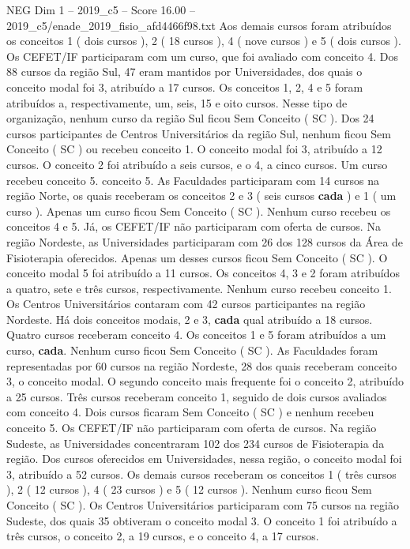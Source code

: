 \begin{textsample}{NEG Dim 1 – 2019\_c5 – Score 16.00 – 2019\_c5/enade\_2019\_fisio\_afd4466f98.txt}
Aos demais cursos foram atribuídos os conceitos 1 ( dois cursos ), 2 ( 18 cursos ), 4 ( nove cursos ) e 5 ( dois cursos ).
Os CEFET/IF participaram com um curso, que foi avaliado com conceito 4.
Dos 88 cursos da região Sul, 47 eram mantidos por Universidades, dos quais o conceito modal foi 3, atribuído a 17 cursos.
Os conceitos 1, 2, 4 e 5 foram atribuídos a, respectivamente, um, seis, 15 e oito cursos.
Nesse tipo de organização, nenhum curso da região Sul ficou Sem Conceito ( SC ).
Dos 24 cursos participantes de Centros Universitários da região Sul, nenhum ficou Sem Conceito ( SC ) ou recebeu conceito 1.
O conceito modal foi 3, atribuído a 12 cursos.
O conceito 2 foi atribuído a seis cursos, e o 4, a cinco cursos.
Um curso recebeu conceito 5. conceito 5.
As Faculdades participaram com 14 cursos na região Norte, os quais receberam os conceitos 2 e 3 ( seis cursos \textbf{cada} ) e 1 ( um curso ).
Apenas um curso ficou Sem Conceito ( SC ).
Nenhum curso recebeu os conceitos 4 e 5.
Já, os CEFET/IF não participaram com oferta de cursos.
Na região Nordeste, as Universidades participaram com 26 dos 128 cursos da Área de Fisioterapia oferecidos.
Apenas um desses cursos ficou Sem Conceito ( SC ).
O conceito modal 5 foi atribuído a 11 cursos.
Os conceitos 4, 3 e 2 foram atribuídos a quatro, sete e três cursos, respectivamente.
Nenhum curso recebeu conceito 1.
Os Centros Universitários contaram com 42 cursos participantes na região Nordeste.
Há dois conceitos modais, 2 e 3, \textbf{cada} qual atribuído a 18 cursos.
Quatro cursos receberam conceito 4.
Os conceitos 1 e 5 foram atribuídos a um curso, \textbf{cada}.
Nenhum curso ficou Sem Conceito ( SC ).
As Faculdades foram representadas por 60 cursos na região Nordeste, 28 dos quais receberam conceito 3, o conceito modal.
O segundo conceito mais frequente foi o conceito 2, atribuído a 25 cursos.
Três cursos receberam conceito 1, seguido de dois cursos avaliados com conceito 4.
Dois cursos ficaram Sem Conceito ( SC ) e nenhum recebeu conceito 5.
Os CEFET/IF não participaram com oferta de cursos.
Na região Sudeste, as Universidades concentraram 102 dos 234 cursos de Fisioterapia da região.
Dos cursos oferecidos em Universidades, nessa região, o conceito modal foi 3, atribuído a 52 cursos.
Os demais cursos receberam os conceitos 1 ( três cursos ), 2 ( 12 cursos ), 4 ( 23 cursos ) e 5 ( 12 cursos ).
Nenhum curso ficou Sem Conceito ( SC ).
Os Centros Universitários participaram com 75 cursos na região Sudeste, dos quais 35 obtiveram o conceito modal 3.
O conceito 1 foi atribuído a três cursos, o conceito 2, a 19 cursos, e o conceito 4, a 17 cursos.

\end{textsample}
